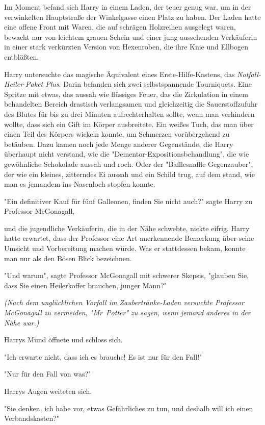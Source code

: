 {Im Moment befand sich Harry in einem Laden, der teuer genug war, um in der verwinkelten Hauptstraße der Winkelgasse einen Platz zu haben. Der Laden hatte eine offene Front mit Waren, die auf schrägen Holzreihen ausgelegt waren, bewacht nur von leichtem grauen Schein und einer jung aussehenden Verkäuferin in einer stark verkürzten Version von Hexenroben, die ihre Knie und Ellbogen entblößten.

Harry untersuchte das magische Äquivalent eines Erste-Hilfe-Kastens, das \emph{Notfall-Heiler-Paket Plus}. Darin befanden sich zwei selbstspannende Tourniquets. Eine Spritze mit etwas, das aussah wie flüssiges Feuer, das die Zirkulation in einem behandelten Bereich drastisch verlangsamen und gleichzeitig die Sauerstoffzufuhr des Blutes für bis zu drei Minuten aufrechterhalten sollte, wenn man verhindern wollte, dass sich ein Gift im Körper ausbreitete. Ein weißes Tuch, das man über einen Teil des Körpers wickeln konnte, um Schmerzen vorübergehend zu betäuben. Dazu kamen noch jede Menge anderer Gegenstände, die Harry überhaupt nicht verstand, wie die "Dementor-Expositionsbehandlung", die wie gewöhnliche Schokolade aussah und roch. Oder der "Bafflesnaffle Gegenzauber", der wie ein kleines, zitterndes Ei aussah und ein Schild trug, auf dem stand, wie man es jemandem ins Nasenloch stopfen konnte.

"Ein definitiver Kauf für fünf Galleonen, finden Sie nicht auch?" sagte Harry zu Professor McGonagall,

und die jugendliche Verkäuferin, die in der Nähe schwebte, nickte eifrig. Harry hatte erwartet, dass der Professor eine Art anerkennende Bemerkung über seine Umsicht und Vorbereitung machen würde. Was er stattdessen bekam, konnte man nur als den Bösen Blick bezeichnen.

"Und warum", sagte Professor McGonagall mit schwerer Skepsis, "glauben Sie, dass Sie einen Heilerkoffer brauchen, junger Mann?"

\emph{(Nach dem unglücklichen Vorfall im Zaubertränke-Laden versuchte Professor McGonagall zu vermeiden, "Mr~Potter" zu sagen, wenn jemand anderes in der Nähe war.)}

Harrys Mund öffnete und schloss sich.

"Ich erwarte nicht, dass ich es brauche! Es ist nur für den Fall!"

"Nur für den Fall von was?"

Harrys Augen weiteten sich.

"Sie denken, ich habe vor, etwas Gefährliches zu tun, und deshalb will ich einen Verbandskasten?"

}
